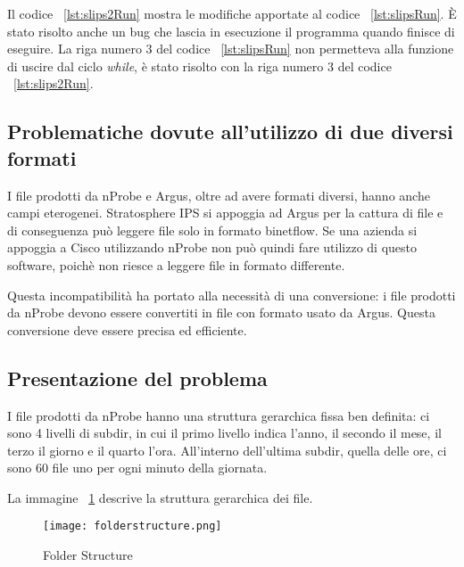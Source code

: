 \documentclass[../main.tex]{subfiles}
\begin{document}


Il codice ~\ref{lst:slips2Run} mostra le modifiche apportate al codice ~\ref{lst:slipsRun}. È stato risolto anche un bug che lascia in esecuzione il programma quando finisce di eseguire. La riga numero 3 del codice ~\ref{lst:slipsRun} non permetteva alla funzione di uscire dal ciclo \textit{while}, è stato risolto con la riga numero 3 del codice ~\ref{lst:slips2Run}.



\subsection{Problematiche dovute all'utilizzo di due diversi formati}
I file prodotti da nProbe e Argus, oltre ad avere formati diversi, hanno anche campi eterogenei. Stratosphere IPS si appoggia ad Argus per la cattura di file e di conseguenza può leggere file solo in formato binetflow. 
Se una azienda si appoggia a Cisco utilizzando nProbe non può quindi fare utilizzo di questo software, poichè non riesce a leggere file in formato differente.

Questa incompatibilità ha portato alla necessità di una conversione: i file prodotti da nProbe devono essere convertiti in file con formato usato da Argus. Questa conversione deve essere precisa ed efficiente.

\subsection{Presentazione del problema}
I file prodotti da nProbe hanno una struttura gerarchica fissa ben definita: ci sono 4 livelli di subdir, in cui il primo livello indica l'anno, il secondo il mese, il terzo il giorno e il quarto l'ora. All'interno dell'ultima subdir, quella delle ore, ci sono 60 file uno per ogni minuto della giornata.

La immagine ~\ref{fig:folderStructure} descrive la struttura gerarchica dei file.

\begin{figure}[H]
\centering
\texttt{[image: folderstructure.png]}
\caption{Folder Structure}
				\label{fig:folderStructure}
\end{figure}
\end{document}
